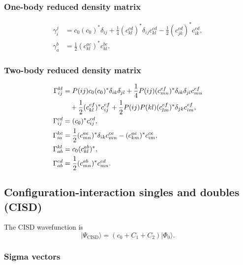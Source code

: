\documentclass[11pt]{article}
\newcommand{\vac}{\Phi_0}
\begin{document}
\subsubsection{One-body reduced density matrix}

\begin{align}
 \gamma^j_i
 &= c_0(c_0)^*\delta_{ij}
    +\frac{1}{4}(c_{kl}^{cd})^*\delta_{ij}c_{kl}^{cd}
    -\frac{1}{2}(c_{jk}^{cd})^*c_{ik}^{cd},
 \\
 \gamma^b_a
 &= \frac{1}{2}(c_{kl}^{ac})^*c_{kl}^{bc}.
\end{align}

\subsubsection{Two-body reduced density matrix}

\begin{align}
 \Gamma^{kl}_{ij}
 &= P(ij)c_0(c_0)^*\delta_{ik}\delta_{jl}
    +\frac{1}{4}P(ij)(c_{mn}^{ef})^*
       \delta_{ik}\delta_{jl}c_{mn}^{ef}
 \notag\\
 &\quad
    +\frac{1}{2}(c_{kl}^{ef})^*c_{ij}^{ef}
    +\frac{1}{2}P(ij)P(kl)(c_{lm}^{ef})^*
       \delta_{jk}c_{im}^{ef},
 \\
 \Gamma^{cd}_{ij}
 &= (c_0)^*c_{ij}^{cd},
 \\
 \Gamma^{kc}_{ia}
 &= \frac{1}{2}(c_{mn}^{ae})^*\delta_{ik}c_{mn}^{ce}
    -(c_{km}^{ae})^*c_{im}^{ce},
 \\
 \Gamma^{kl}_{ab}
 &= c_0(c_{kl}^{ab})^*,
 \\
 \Gamma^{cd}_{ab}
 &= \frac{1}{2}(c_{mn}^{ab})^*c_{mn}^{cd}.
\end{align}


\clearpage
\subsection{Configuration-interaction singles and doubles (CISD)}

The CISD wavefunction is
\begin{equation}
 \lvert\Psi_{\mathrm{CISD}}\rangle
 = (c_0+C_1+C_2)\lvert\vac\rangle.
\end{equation}

\subsubsection{Sigma vectors}
\end{document}
